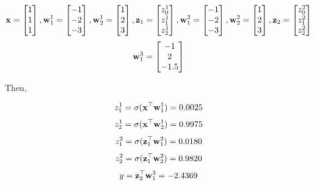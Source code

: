 \documentclass[12pt, fullpage,letterpaper]{article}
\begin{document}
\begin{enumerate}
	\[
	    {\bf x} = \begin{bmatrix}
	    1 \\
	    1 \\
	    1 \\
	    \end{bmatrix}, {\bf w}^1_1 = \begin{bmatrix}
	    -1\\
	    -2 \\
	    -3 \\
	    \end{bmatrix},  {\bf w}^1_2 = \begin{bmatrix}
	    1\\
	    2 \\
	    3 \\
	    \end{bmatrix},  {\bf z}_1 = \begin{bmatrix}
	    z^1_0\\
	    z^1_1 \\
	    z^1_2 \\
	    \end{bmatrix}, {\bf w}^2_1 = \begin{bmatrix}
	    -1\\
	    -2 \\
	    -3 \\
	    \end{bmatrix},  {\bf w}^2_2 = \begin{bmatrix}
	    1\\
	    2 \\
	    3 \\
	    \end{bmatrix},  {\bf z}_2 = \begin{bmatrix}
	    z^2_0\\
	    z^2_1 \\
	    z^2_2 \\
	    \end{bmatrix}
    \]
    \[
        {\bf w}^3_1 = \begin{bmatrix}
	    -1\\
	    2 \\
	    -1.5 \\
	    \end{bmatrix}
	\]
	
	Then,
	
	\[
	    z^1_1 = \sigma({\bf x}^\top {\bf w}^1_1) = 0.0025
	\]
	\[
	    z^1_2 = \sigma({\bf x}^\top {\bf w}^1_2) = 0.9975
	\]
	\[
	    z^2_1 = \sigma({\bf z}_1^\top {\bf w}^2_1) = 0.0180
	\]
	\[
	    z^2_2 = \sigma({\bf z}_1^\top {\bf w}^2_2) = 0.9820
	\]
	\[
	    y = {\bf z}_2^\top {\bf w}^3_1 = -2.4369
	\]
	

\end{enumerate}
\end{document}
